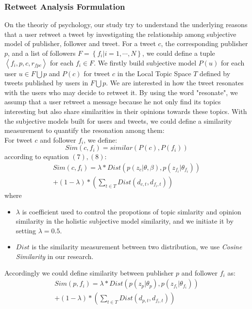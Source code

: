 \documentclass{acm_proc_article-sp}
\begin{document}
\subsubsection{Retweet Analysis Formulation}
On the theoriy of psychology, our study try to understand the underlying reasons that a user retweet a tweet by investigating the relationship among subjective model of publisher, follower and tweet. For a tweet $ c $, the corresponding publisher $ p $, and a list of followers $ F= \left\lbrace f_{i} \vert i=1, \cdots, N \right\rbrace  $, we could define a tuple $ \left\langle f_{i}, p, c, r_{fpc} \right\rangle  $ for each $ f_{i} \in F $.
We firstly build subjective model $ P\left( u \right)  $ for each user $ u \in F \bigcup p $ and $ P\left( c \right)  $ for tweet $ c $ in the Local Topic Space $ T $ defined by tweets published by users in $ F \bigcup p $. 
We are interested in how the tweet resonates with the users who may decide to retweet it.
By using the word "resonate", we assump that a user retweet a message because he not only find its topics interesting but also share similarities in their opinions towards these topics.
With the subjective models built for users and tweets, we could define a similarity measurement to quantify the resonation among them:\\
For tweet $ c $ and follower $ f_{i} $, we define:
\begin{equation}
Sim\left( c,f_{i} \right) = similar\left( P\left( c \right), P\left( f_{i} \right) \right)
\end{equation}
according to equation $ \left( 7 \right), \left( 8 \right) $:
\begin{equation}
\begin{split}
Sim\left( c,f_{i} \right) = \lambda \ast Dist\left( p\left( z_{c} \vert \theta, \beta \right), p\left( z_{f_{i}} \vert \theta_{f_{i}} \right) \right) \\
+\left(1-\lambda \right) \ast \left( \sum_{t \in T} Dist \left( d_{c,t}, d_{f_{i}, t} \right)  \right)
\end{split}
\end{equation}
where 
\begin{itemize}
\item $ \lambda $ is coefficient used to control the propotions of topic simlarity and opinion similarity in the holistic subjective model similarity, and we initiate it by setting $ \lambda =0.5 $. 
\item $ Dist $ is the similarity measurement between two distribution, we use \emph{Cosine Similarity } in our research.
\end{itemize}
Accordingly we could define similarity between publisher $ p $ and follower $ f_{i} $ as:
\begin{equation}
\begin{split}
Sim\left( p,f_{i} \right) = \lambda \ast Dist\left( p\left( z_{p} \vert \theta_{p} \right), p\left( z_{f_{i}} \vert \theta_{f_{i}} \right) \right) \\
+\left(1-\lambda \right) \ast \left( \sum_{t \in T} Dist \left( d_{p,t}, d_{f_{i}, t} \right)  \right)
\end{split}
\end{equation}
\end{document}
